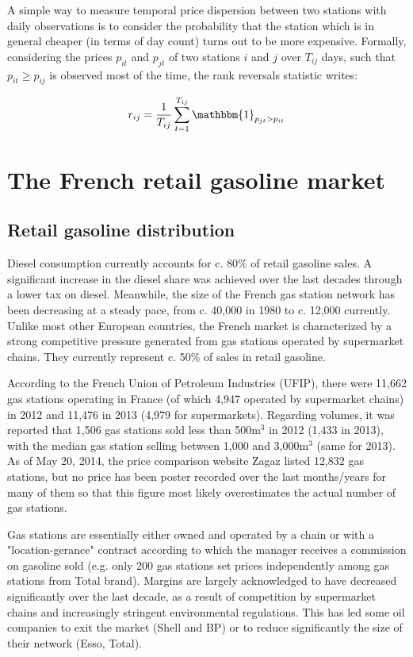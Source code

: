\documentclass[english]{article}
\begin{document}
A simple way to measure temporal price dispersion between two stations with daily observations is to consider the probability that the station which is in general cheaper (in terms of day count) turns out to be more expensive. Formally, considering the prices $p_{it}$ and $p_{jt}$ of two stations $i$ and $j$ over $T_{ij}$ days, such that $p_{it} \ge p_{ij}$ is observed most of the time, the rank reversals statistic writes:

\begin{align*}
r_{ij} = \frac{1}{T_{ij}} \sum_{t=1}^{T_{ij}} \mathbbm{1}_{p_{jt} > p_{it}}
\end{align*}

\section{The French retail gasoline market}

\subsection{Retail gasoline distribution}

Diesel consumption currently accounts for c. 80\% of retail gasoline sales. A significant increase in the diesel share was achieved over the last decades through a lower tax on diesel. Meanwhile, the size of the French gas station network has been decreasing at a steady pace, from c. 40,000 in 1980 to c. 12,000 currently.  Unlike most other European countries, the French market is characterized by a strong competitive pressure generated from gas stations operated by supermarket chains. They currently represent c. 50\% of sales in retail gasoline.

According to the French Union of Petroleum Industries (UFIP), there were 11,662 gas stations operating in France (of which 4,947 operated by supermarket chains) in 2012 and 11,476 in 2013 (4,979 for supermarkets). Regarding volumes, it was reported that 1,506 gas stations sold less than 500m$^{3}$ in 2012 (1,433 in 2013), with the median gas station selling between 1,000 and 3,000m$^{3}$ (same for 2013). As of May 20, 2014, the price comparison website Zagaz listed 12,832 gas stations, but no price has been poster recorded over the last months/years for many of them so that this figure most likely overestimates the actual number of gas stations.

Gas stations are essentially either owned and operated by a chain or with a "location-gerance" contract according to which the manager receives a commission on gasoline sold (e.g. only 200 gas stations set prices independently among gas stations from Total brand). Margins are largely acknowledged to have decreased significantly over the last decade, as a result of competition by supermarket chains and increasingly stringent environmental regulations. This has led some oil companies to exit the market (Shell and BP) or to reduce significantly the size of their network (Esso, Total).
\end{document}
